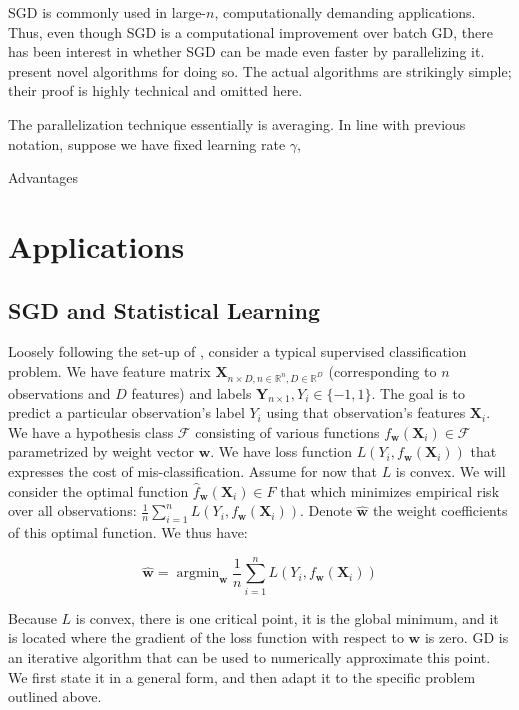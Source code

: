 \documentclass{article}
\DeclareMathOperator*{\argmin}{argmin}
\begin{document}
SGD is commonly used in large-$n$, computationally demanding applications. Thus,
even though SGD is a computational improvement over batch GD, there has been
interest in whether SGD can be made even faster by parallelizing it.
\cite{zinkevich2010parallelized} present novel algorithms for doing so. The
actual algorithms are strikingly simple; their proof is highly technical and
omitted here.

The parallelization technique essentially is averaging. In line with previous
notation, suppose we have fixed learning rate $\gamma$, 

Advantages

\section{Applications}

\cite{shalev2011pegasos}
\subsection{SGD and Statistical Learning}
\cite{dal2015calibrating}

Loosely following the set-up of , consider a typical supervised classification problem. We have
feature matrix $\bm{X}_{n \times D, n \in \mathbb{R}^n, D \in \mathbb{R}^D}$ (corresponding to $n$ observations and $D$
features) and labels $\bm{Y}_{n \times 1}, Y_i \in \{-1, 1\}$. The goal is to
predict a particular observation's label $Y_i$ using that observation's features $\bm{X}_i$. 
We have a hypothesis class $\mathcal{F}$ consisting of
various functions $f_{\bm{w}}(\bm{X}_i) \in \mathcal{F}$ parametrized by weight
vector $\bm{w}$. We have loss function $L(Y_i, f_{\bm{w}}(\bm{X}_i))$ that
expresses the cost of mis-classification. Assume for now that $L$ is convex. 
We will consider the optimal function $\hat{f}_{\bm{w}}(\bm{X}_i) \in F$ 
that which minimizes empirical risk over all observations: $\frac{1}{n}
\sum_{i=1}^n L(Y_i, f_{\bm{w}}(\bm{X}_i))$.
Denote $\hat{\bm{w}}$ the weight coefficients of this optimal function. We thus
have:

\begin{equation}
	\hat{\bm{w}} = \argmin_{\bm{w}}\frac{1}{n} \sum_{i=1}^n L(Y_i, f_{\bm{w}}(\bm{X}_i))
\end{equation}

Because $L$ is convex, there is one critical point,
it is the global minimum, and it is located where the gradient of the loss
function with respect to $\bm{w}$ is zero. GD is an iterative
algorithm that can be used to numerically approximate this point. We first state
it in a general form, and then adapt it to the specific problem outlined above.
\end{document}
